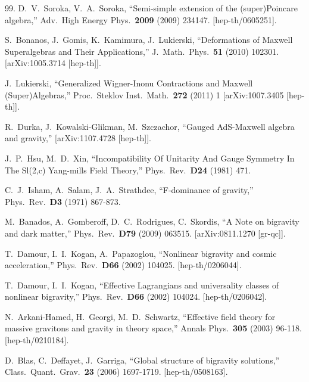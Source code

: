 \documentclass [prd,reprint,eqsecnum,nofootinbib]  {revtex4-1}
\begin{document}
\begin{thebibliography}{99.}
  D.~V.~Soroka, V.~A.~Soroka,
  ``Semi-simple extension of the (super)Poincare algebra,''
  Adv.\ High Energy Phys.\  {\bf 2009 } (2009)  234147.
  [hep-th/0605251].

  S.~Bonanos, J.~Gomis, K.~Kamimura, J.~Lukierski,
  ``Deformations of Maxwell Superalgebras and Their Applications,''
  J.\ Math.\ Phys.\  {\bf 51 } (2010)  102301.
  [arXiv:1005.3714 [hep-th]].

  J.~Lukierski,
  ``Generalized Wigner-Inonu Contractions and Maxwell (Super)Algebras,''
  Proc.\ Steklov Inst.\ Math.\  {\bf 272} (2011) 1
  [arXiv:1007.3405 [hep-th]].

  R.~Durka, J.~Kowalski-Glikman, M.~Szczachor,
  ``Gauged AdS-Maxwell algebra and gravity,''
[arXiv:1107.4728 [hep-th]].



  J.~P.~Hsu, M.~D.~Xin,
  ``Incompatibility Of Unitarity And Gauge Symmetry In The Sl(2,c) Yang-mills Field Theory,''
  Phys.\ Rev.\  {\bf D24 } (1981)  471.

  C.~J.~Isham, A.~Salam, J.~A.~Strathdee,
  ``F-dominance of gravity,''
  Phys.\ Rev.\  {\bf D3 } (1971)  867-873.

  M.~Banados, A.~Gomberoff, D.~C.~Rodrigues, C.~Skordis,
  ``A Note on bigravity and dark matter,''
  Phys.\ Rev.\  {\bf D79 } (2009)  063515.
  [arXiv:0811.1270 [gr-qc]].

  T.~Damour, I.~I.~Kogan, A.~Papazoglou,
  ``Nonlinear bigravity and cosmic acceleration,''
  Phys.\ Rev.\  {\bf D66 } (2002)  104025.
  [hep-th/0206044].

  T.~Damour, I.~I.~Kogan,
 ``Effective Lagrangians and universality classes of nonlinear bigravity,''
  Phys.\ Rev.\  {\bf D66 } (2002)  104024.
  [hep-th/0206042].


  N.~Arkani-Hamed, H.~Georgi, M.~D.~Schwartz,
  ``Effective field theory for massive gravitons and gravity in theory space,''
  Annals Phys.\  {\bf 305 } (2003)  96-118.
  [hep-th/0210184].

  D.~Blas, C.~Deffayet, J.~Garriga,
 ``Global structure of bigravity solutions,''
  Class.\ Quant.\ Grav.\  {\bf 23 } (2006)  1697-1719.
  [hep-th/0508163].


\end{thebibliography}
\end{document}
